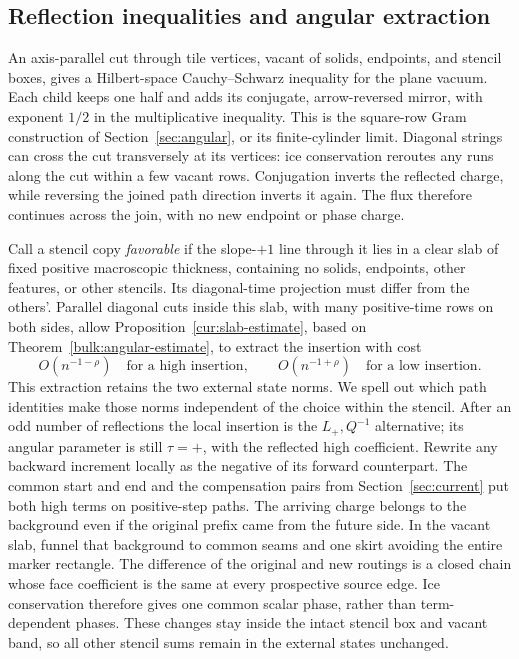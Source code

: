 \subsection{Reflection inequalities and angular extraction}

An axis-parallel cut through tile vertices, vacant of solids,
endpoints, and stencil boxes, gives a Hilbert-space Cauchy--Schwarz
inequality for the plane vacuum.  Each child keeps one half and adds
its conjugate, arrow-reversed mirror, with exponent $1/2$ in the
multiplicative inequality.  This is the square-row Gram construction
of Section~\ref{sec:angular}, or its finite-cylinder limit.  Diagonal
strings can cross the cut transversely at its vertices: ice
conservation reroutes any runs along the cut within a few vacant rows.
Conjugation inverts the reflected charge, while reversing the joined
path direction inverts it again.  The flux therefore continues across
the join, with no new endpoint or phase charge.

Call a stencil copy \emph{favorable} if the slope-$+1$ line through
it lies in a clear slab of fixed positive macroscopic thickness,
containing no solids, endpoints, other features, or other stencils.
Its diagonal-time projection must differ from the others'.  Parallel
diagonal cuts inside this slab, with many positive-time rows on both
sides, allow Proposition~\ref{cur:slab-estimate}, based on
Theorem~\ref{bulk:angular-estimate}, to extract the insertion with cost
\begin{equation}
 O(n^{-1-\rho})\quad\text{for a high insertion},\qquad
 O(n^{-1+\rho})\quad\text{for a low insertion}.
 \label{hol:angular-costs}
\end{equation}
This extraction retains the two external state norms.  We spell out
which path identities make those norms independent of the choice
within the stencil.  After an odd number of reflections the local
insertion is the $L_+,Q^{-1}$ alternative; its angular parameter is
still $\tau=+$, with the reflected high coefficient.  Rewrite any
backward increment locally as the negative of its forward counterpart.
The common start and end and the compensation pairs from
Section~\ref{sec:current} put both high terms on positive-step paths.
The arriving charge belongs to the background even if the original
prefix came from the future side.  In the vacant slab, funnel that
background to common seams and one skirt avoiding the entire marker
rectangle.  The difference of the original and new routings is a
closed chain whose face coefficient is the same at every prospective
source edge.  Ice conservation therefore gives one common scalar
phase, rather than term-dependent phases.  These changes stay inside
the intact stencil box and vacant band, so all other stencil sums
remain in the external states unchanged.

